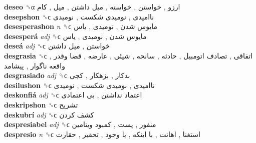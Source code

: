 \textbf{deseo} ␝α   ارزو ,  خواستن ,  خواسته ,  میل داشتن ,  میل ,  کام   \\
\textbf{desepshon} ␝ϲ   ناامیدی ,  نومیدی شکست ,  نومیدی   \\
\textbf{desesperashon} \emph{n}  ␝ϲ   مایوس شدن ,  نومیدی ,  یاس   \\
\textbf{desesperá} \emph{adj}  ␝ϲ   مایوس شدن ,  نومیدی ,  یاس   \\
\textbf{deseá} \emph{adj}  ␝ϲ   خواستن ,  میل داشتن   \\
\textbf{desgrasia} ␝ϲ   اتفاقی ,  تصادف اتومبیل ,  حادثه ,  سانحه ,  شیئی ,  عارضه ,  قضا وقدر ,  واقعه ناگوار ,  پیشامد   \\
\textbf{desgrasiado} \emph{adj}  ␝ϲ   بدکار ,  بزهکار ,  کجی   \\
\textbf{desilushon} ␝ϲ   ناامیدی ,  نومیدی شکست ,  نومیدی   \\
\textbf{deskonfiá} \emph{adj}  ␝ϲ   اعتماد نداشتن ,  بی اعتمادی   \\
\textbf{deskripshon} ␝ϲ   تشریح   \\
\textbf{deskubrí} \emph{adj}  ␝ϲ   کشف کردن   \\
\textbf{despresiabel} \emph{adj}  ␝ϲ   منفور ,  پست ,  کمبود ویتامین   \\
\textbf{despresio} \emph{n}  ␝ϲ   استغنا ,  اهانت ,  با اینکه ,  با وجود ,  تحقیر ,  حقارت   \\
